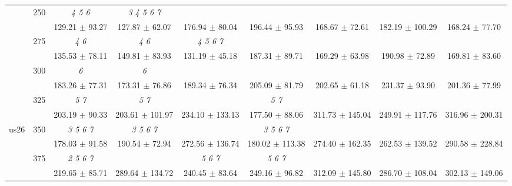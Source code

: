 \begin{table}[h]
{\begin{tabular}{
        ccccccccc}
 & \multirow{2}{*}{250}& \textit{ 4 5 6 }& \textit{ 3 4 5 6 7 }& & & & &  \\ 
 & & 129.21 $\pm$ 93.27& 127.87 $\pm$ 62.07& 176.94 $\pm$ 80.04& 196.44 $\pm$ 95.93& 168.67 $\pm$ 72.61& 182.19 $\pm$ 100.29& 168.24 $\pm$ 77.70 \\ 
 & \multirow{2}{*}{275}& \cellcolor[HTML]{EFEFEF} \textit{ 4 6 }& \cellcolor[HTML]{EFEFEF} \textit{ 4 6 }& \cellcolor[HTML]{EFEFEF} \textit{ 4 5 6 7 }& \cellcolor[HTML]{EFEFEF} & \cellcolor[HTML]{EFEFEF} & \cellcolor[HTML]{EFEFEF} & \cellcolor[HTML]{EFEFEF}  \\ 
 & & \cellcolor[HTML]{EFEFEF} 135.53 $\pm$ 78.11& \cellcolor[HTML]{EFEFEF} 149.81 $\pm$ 83.93& \cellcolor[HTML]{EFEFEF} 131.19 $\pm$ 45.18& \cellcolor[HTML]{EFEFEF} 187.31 $\pm$ 89.71& \cellcolor[HTML]{EFEFEF} 169.29 $\pm$ 63.98& \cellcolor[HTML]{EFEFEF} 190.98 $\pm$ 72.89& \cellcolor[HTML]{EFEFEF} 169.81 $\pm$ 83.60 \\ 
 & \multirow{2}{*}{300}& \textit{ 6 }& \textit{ 6 }& & & & &  \\ 
 & & 183.26 $\pm$ 77.31& 173.31 $\pm$ 76.86& 189.34 $\pm$ 76.34& 205.09 $\pm$ 81.79& 202.65 $\pm$ 61.18& 231.37 $\pm$ 93.90& 201.36 $\pm$ 77.99 \\ 
 & \multirow{2}{*}{325}& \cellcolor[HTML]{EFEFEF} \textit{ 5 7 }& \cellcolor[HTML]{EFEFEF} \textit{ 5 7 }& \cellcolor[HTML]{EFEFEF} & \cellcolor[HTML]{EFEFEF} \textit{ 5 7 }& \cellcolor[HTML]{EFEFEF} & \cellcolor[HTML]{EFEFEF} & \cellcolor[HTML]{EFEFEF}  \\ 
 & & \cellcolor[HTML]{EFEFEF} 203.19 $\pm$ 90.33& \cellcolor[HTML]{EFEFEF} 203.61 $\pm$ 101.97& \cellcolor[HTML]{EFEFEF} 234.10 $\pm$ 133.13& \cellcolor[HTML]{EFEFEF} 177.50 $\pm$ 88.06& \cellcolor[HTML]{EFEFEF} 311.73 $\pm$ 145.04& \cellcolor[HTML]{EFEFEF} 249.91 $\pm$ 117.76& \cellcolor[HTML]{EFEFEF} 316.96 $\pm$ 200.31 \\ 
 \multirow{4}{*}{us26} & \multirow{2}{*}{350}& \textit{ 3 5 6 7 }& \textit{ 3 5 6 7 }& & \textit{ 3 5 6 7 }& & &  \\ 
 & & 178.03 $\pm$ 91.58& 190.54 $\pm$ 72.94& 272.56 $\pm$ 136.74& 180.02 $\pm$ 113.38& 274.40 $\pm$ 162.35& 262.53 $\pm$ 139.52& 290.58 $\pm$ 228.84 \\ 
 & \multirow{2}{*}{375}& \cellcolor[HTML]{EFEFEF} \textit{ 2 5 6 7 }& \cellcolor[HTML]{EFEFEF} & \cellcolor[HTML]{EFEFEF} \textit{ 5 6 7 }& \cellcolor[HTML]{EFEFEF} \textit{ 5 6 7 }& \cellcolor[HTML]{EFEFEF} & \cellcolor[HTML]{EFEFEF} & \cellcolor[HTML]{EFEFEF}  \\ 
 & & \cellcolor[HTML]{EFEFEF} 219.65 $\pm$ 85.71& \cellcolor[HTML]{EFEFEF} 289.64 $\pm$ 134.72& \cellcolor[HTML]{EFEFEF} 240.45 $\pm$ 83.64& \cellcolor[HTML]{EFEFEF} 249.16 $\pm$ 96.82& \cellcolor[HTML]{EFEFEF} 312.09 $\pm$ 145.80& \cellcolor[HTML]{EFEFEF} 286.70 $\pm$ 108.04& \cellcolor[HTML]{EFEFEF} 302.13 $\pm$ 149.06 \\ 

\end{tabular}}
\end{table}

